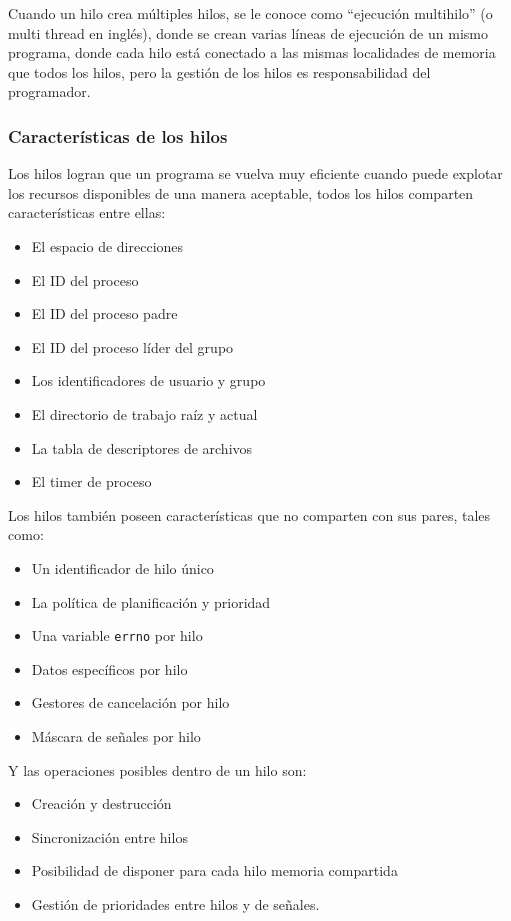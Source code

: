 Cuando un hilo crea múltiples hilos, se le conoce como ``ejecución multihilo'' (o multi thread en inglés), donde se crean varias líneas de ejecución de un mismo programa, donde cada hilo está conectado a las mismas localidades de memoria que todos los hilos, pero la gestión de los hilos es responsabilidad del programador.

\subsubsection{Características de los hilos}

Los hilos logran que un programa se vuelva muy eficiente cuando puede explotar los recursos disponibles de una manera aceptable, todos los hilos comparten características entre ellas:\cite*{rua-unam-hilos-c-no-date}

\begin{itemize}
	\item   El espacio de direcciones
	\item   El ID del proceso
	\item   El ID del proceso padre
	\item   El ID del proceso líder del grupo
	\item   Los identificadores de usuario y grupo
	\item   El directorio de trabajo raíz y actual
	\item   La tabla de descriptores de archivos
	\item   El timer de proceso
\end{itemize}

Los hilos también poseen características que no comparten con sus pares, tales como:

\begin{itemize}
	\item   Un identificador de hilo único
	\item   La política de planificación y prioridad
	\item   Una variable \texttt{errno} por hilo
	\item   Datos específicos por hilo
	\item   Gestores de cancelación por hilo
	\item   Máscara de señales por hilo
\end{itemize}

Y las operaciones posibles dentro de un hilo son:

\begin{itemize}
	\item   Creación y destrucción
	\item   Sincronización entre hilos
	\item   Posibilidad de disponer para cada hilo memoria compartida
	\item   Gestión de prioridades entre hilos y de señales.
\end{itemize}

